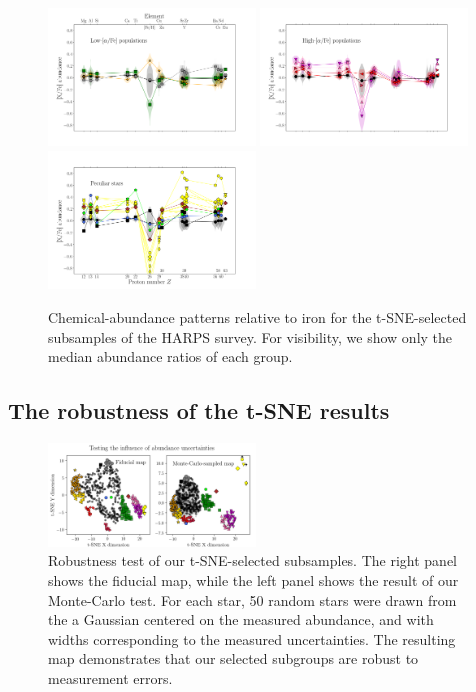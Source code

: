 \documentclass{aa}  %
\begin{document}
\begin{figure}\centering
 \includegraphics[trim=0cm 2cm 0cm 0cm, clip=true, width=0.49\textwidth]{im/harps_tsne_abundances-relto-Fe_thin.png}
 \includegraphics[trim=0cm 2cm 0cm 2cm, clip=true, width=0.49\textwidth]{im/harps_tsne_abundances-relto-Fe_thick.png}
 \includegraphics[trim=0cm 0 0cm 2cm, clip=true, width=0.49\textwidth]{im/harps_tsne_abundances-relto-Fe_strange.png}
\caption{Chemical-abundance patterns relative to iron for the t-SNE-selected subsamples of the HARPS survey. For visibility, we show only the median abundance ratios of each group.}
\label{harps3}
\end{figure}

\subsection{The robustness of the t-SNE results}

\begin{figure}\centering
 \includegraphics[width=0.49\textwidth]{im/harps_tsne-mctest_teffcut.png}
\caption{Robustness test of our t-SNE-selected subsamples. The right panel shows the fiducial map, while the left panel shows the result of our Monte-Carlo test. For each star, 50 random stars were drawn from the a Gaussian centered on the measured abundance, and with widths corresponding to the measured uncertainties. The resulting map demonstrates that our selected subgroups are robust to measurement errors.}
\label{harps2}
\end{figure}
\end{document}
